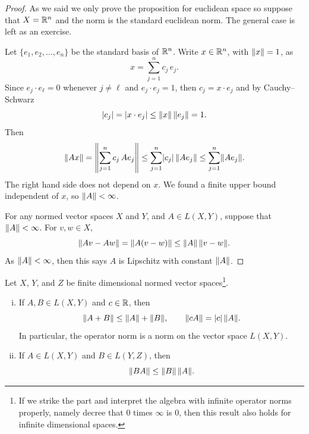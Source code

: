 \begin{proof}
As we said we only prove the proposition for euclidean space so suppose
that $X = {\mathbb{R}}^n$ and the norm is the standard euclidean norm.
The general case is left as an exercise.

Let $\{ e_1,e_2,\ldots,e_n \}$ be the standard basis of ${\mathbb{R}}^n$.
Write $x \in {\mathbb{R}}^n$, with $\lVert {x} \rVert = 1$, as
\begin{equation*}
x = \sum_{j=1}^n c_j \, e_j .
\end{equation*}
Since $e_j \cdot e_\ell = 0$ whenever $j\not=\ell$ and $e_j \cdot e_j = 1$,
then $c_j = x \cdot e_j$ and by Cauchy--Schwarz
\begin{equation*}
\lvert {c_j} \rvert = \lvert { x \cdot e_j } \rvert
\leq \lVert {x} \rVert \, \lVert {e_j} \rVert = 1 .
\end{equation*}
Then
\begin{equation*}
\lVert {Ax} \rVert =
\left\lVert {\sum_{j=1}^n c_j \, Ae_j} \right\rVert
\leq
\sum_{j=1}^n \lvert {c_j} \rvert \, \lVert {Ae_j} \rVert 
\leq
\sum_{j=1}^n \lVert {Ae_j} \rVert .
\end{equation*}
The right hand side does not depend on $x$.  We found
a finite upper bound independent of $x$, so $\lVert {A} \rVert < \infty$.

For any normed vector spaces $X$ and $Y$, and $A \in L(X,Y)$, suppose that
$\lVert {A} \rVert < \infty$.
For $v,w \in X$,
\begin{equation*}
\lVert {Av - Aw} \rVert =
\lVert {A(v-w)} \rVert \leq \lVert {A} \rVert \, \lVert {v-w} \rVert .
\end{equation*}
As $\lVert {A} \rVert < \infty$, then this says $A$ is Lipschitz with constant $\lVert {A} \rVert$.
\end{proof}

\begin{prop} \label{prop:finitedimpropnorm}
Let $X$, $Y$, and $Z$ be finite dimensional normed vector
spaces\footnote{If we strike the  part and interpret the
algebra with infinite operator norms properly, namely decree that $0$ times
$\infty$ is 0, then this result also holds for infinite
dimensional spaces.}.
\begin{enumerate}[(i)]
\item \label{item:finitedimpropnorm:i}
If $A,B \in L(X,Y)$ and $c \in {\mathbb{R}}$, then
\begin{equation*}
\lVert {A+B} \rVert \leq \lVert {A} \rVert+\lVert {B} \rVert, \qquad \lVert {cA} \rVert = \lvert {c} \rvert \, \lVert {A} \rVert .
\end{equation*}
In particular, the operator norm is a norm on the vector space $L(X,Y)$.
\item \label{item:finitedimpropnorm:ii}
If $A \in L(X,Y)$ and $B \in L(Y,Z)$, then
\begin{equation*}
\lVert {BA} \rVert \leq \lVert {B} \rVert \, \lVert {A} \rVert .
\end{equation*}
\end{enumerate}
\end{prop}

